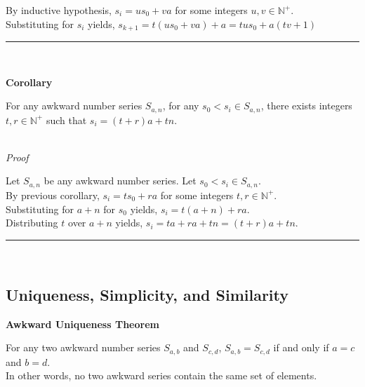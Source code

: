 \documentclass[a4paper,12pt]{article}
\begin{document}
\noindent By inductive hypothesis, $s_i = us_0 + va$ for some integers $u, v \in \mathbb{N}^+$.\\

\noindent Substituting for $s_i$ yields, $s_{k + 1} = t(us_0 + va) + a = tus_0 + a(tv + 1)$


\begin{center}
\noindent\rule{8cm}{0.4pt}
\end{center}
\noindent \\








\label{corollary:relation_to_initial_p2}
\hypertarget{corollary:relation_to_initial_p2}{}
\begin{tcolorbox}
\textbf{Corollary}

For any awkward number series $S_{a,n}$, for any $s_0 < s_i \in S_{a,n}$, there exists integers $t, r \in \mathbb{N}^+$ such that $s_i = (t + r)a + tn$.

\end{tcolorbox}


\noindent \\
\textit{Proof}

\noindent Let $S_{a,n}$ be any awkward number series. Let $s_0 < s_i \in S_{a, n}$.\\

\noindent By previous corollary, $s_i = ts_0 + ra$ for some integers $t, r \in \mathbb{N}^+$.\\

\noindent Substituting for $a + n$ for $s_0$ yields, $s_i = t(a + n) + ra$.\\

\noindent Distributing $t$ over $a + n$ yields, $s_i = ta + ra + tn = (t + r)a + tn$.

\begin{center}
\noindent\rule{8cm}{0.4pt}
\end{center}
\noindent \\





\subsection{Uniqueness, Simplicity, and Similarity}



\label{theorem:awkward_uniqueness}
\hypertarget{theorem:awkward_uniqueness}{}
\begin{tcolorbox}
\textbf{Awkward Uniqueness Theorem}

\noindent For any two awkward number series $S_{a,b}$ and $S_{c,d}$, $S_{a,b} = S_{c,d}$ if and only if $a = c$ and $b = d$.\\

\noindent In other words, no two awkward series contain the same set of elements.
\end{tcolorbox}
\end{document}
